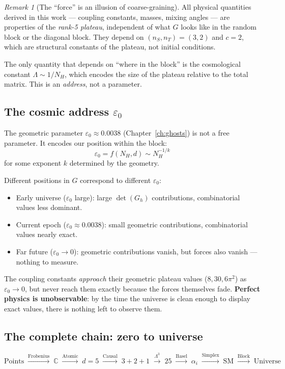 \documentclass[12pt]{article}
\theoremstyle{remark}
\newtheorem{remark}[theorem]{Remark}
\theoremstyle{definition}
\newcommand{\CC}{\mathbb{C}}
\begin{document}
\begin{remark}[The ``force'' is an illusion of coarse-graining]
All physical quantities derived in this work --- coupling constants, masses, mixing angles --- are properties of the \emph{rank-5 plateau}, independent of what $G$ looks like in the random block or the diagonal block. They depend on $(n_S, n_T) = (3, 2)$ and $c = 2$, which are structural constants of the plateau, not initial conditions.

The only quantity that depends on ``where in the block'' is the cosmological constant $\Lambda \sim 1/N_H$, which encodes the size of the plateau relative to the total matrix. This is an \emph{address}, not a parameter.

\subsection{The cosmic address $\varepsilon_0$}

The geometric parameter $\varepsilon_0 \approx 0.0038$ (Chapter~\ref{ch:ghosts}) is not a free parameter. It encodes our position within the block:
\begin{equation}
\varepsilon_0 = f(N_H, d) \sim N_H^{-1/k}
\end{equation}
for some exponent $k$ determined by the geometry.

Different positions in $G$ correspond to different $\varepsilon_0$:
\begin{itemize}
\item Early universe ($\varepsilon_0$ large): large $\det(G_h)$ contributions, combinatorial values less dominant.
\item Current epoch ($\varepsilon_0 \approx 0.0038$): small geometric contributions, combinatorial values nearly exact.
\item Far future ($\varepsilon_0 \to 0$): geometric contributions vanish, but forces also vanish --- nothing to measure.
\end{itemize}

The coupling constants \emph{approach} their geometric plateau values ($8, 30, 6\pi^2$) as $\varepsilon_0 \to 0$, but never reach them exactly because the forces themselves fade. \textbf{Perfect physics is unobservable}: by the time the universe is clean enough to display exact values, there is nothing left to observe them.

\subsection{The complete chain: zero to universe}

\begin{equation}
\boxed{
\text{Points} \;\xrightarrow{\text{Frobenius}}\; \CC
\;\xrightarrow{\text{Atomic}}\; d = 5
\;\xrightarrow{\text{Causal}}\; 3\!+\!2\!+\!1
\;\xrightarrow{\Lambda^3}\; 25
\;\xrightarrow{\text{Basel}}\; \alpha_i
\;\xrightarrow{\text{Simplex}}\; \text{SM}
\;\xrightarrow{\text{Block}}\; \text{Universe}
}
\end{equation}


\end{remark}
\end{document}
